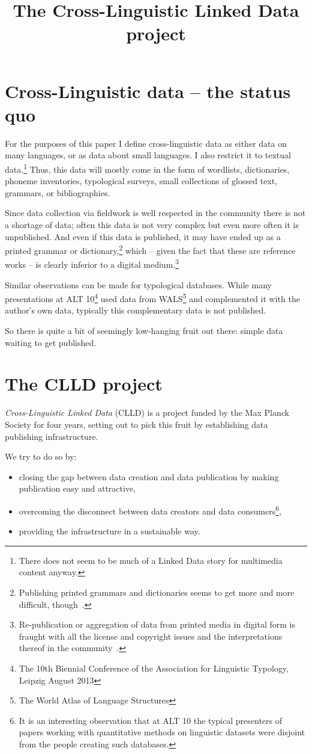 \documentclass[a4paper,10pt]{article}
\title{The Cross-Linguistic Linked Data project}
\begin{document}
\maketitleabstract

\section{Cross-Linguistic data -- the status quo}
For the purposes of this paper I define cross-linguistic data as either data on many languages, 
or as data about small languages. I also restrict it to textual data.\footnote{There does not seem to be much of a 
Linked Data story for multimedia content anyway.}
Thus, this data will mostly come in the form of 
wordlists, dictionaries, phoneme inventories, typological surveys, small collections of glossed text, grammars, or bibliographies.

Since data collection via fieldwork is well respected in the community
there is not a shortage of data;
often this data is not very complex but even more often it is unpublished. And even if this data is published, it may have ended up as a printed grammar or dictionary,\footnote{Publishing printed grammars and dictionaries seems to get more and more difficult, though~\cite{dlc631}.} which -- given the fact that these are reference works -- is clearly inferior to a digital medium.\footnote{Re-publication or aggregation of data from printed media in digital form is fraught with all the license and copyright issues and the interpretations thereof in the community~\cite{austin2011}.}

Similar observations can be made for typological databases. While many presentations at ALT 10\footnote{The 10th Biennial Conference of the Association for Linguistic Typology, Leipzig August 2013} used data from WALS\footnote{The World Atlas of Language Structures} and complemented it with the author's own data, typically this complementary data is not published.

So there is quite a bit of seemingly low-hanging fruit out there: simple data waiting to get published.

\section{The CLLD project}
\emph{Cross-Linguistic Linked Data} (CLLD) is a project funded by the Max Planck Society for four years, 
setting out to pick this fruit by establishing data publishing infrastructure.

We try to do so by:
\begin{itemize}
\item closing the gap between data creation and data publication by making publication easy and attractive,
\item overcoming the disconnect between data creators and data consumers\footnote{It is an interesting observation that at ALT 10 the typical presenters of papers working with quantitative methods on linguistic datasets were disjoint from the people creating such databases.},
\item providing the infrastructure in a sustainable way.
\end{itemize}
\end{document}
